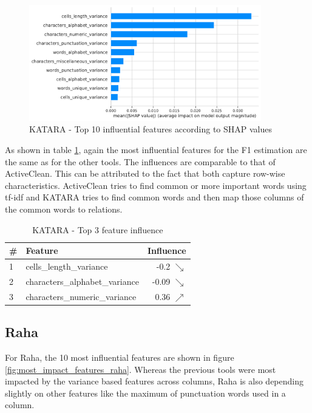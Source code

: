 \begin{figure}[H]
    \centering
    \includegraphics[width=0.9\textwidth]{thesis/Figures/RQ4/Shap_cell_f1_KATARA.pdf}
    \caption{KATARA - Top 10 influential features according to SHAP values}
    \label{fig:most_impact_features_katara}
\end{figure}

As shown in table \ref{tab:top_influence_features_KATARA}, again the most influential features for the F1 estimation are the same as for the other tools. The influences are comparable to that of ActiveClean. This can be attributed to the fact that both capture row-wise characteristics. ActiveClean tries to find common or more important words using tf-idf and KATARA tries to find common words and then map those columns of the common words to relations. 

\begin{table}[H]
\centering
\begin{tabular}{llr}
\toprule
 \# &                         Feature &         Influence \\
\midrule
 1 &         cells\_length\_variance &   -0.2 $\searrow$ \\
 2 &  characters\_alphabet\_variance &  -0.09 $\searrow$ \\
 3 &   characters\_numeric\_variance &   0.36 $\nearrow$ \\
\bottomrule
\end{tabular}
\caption{KATARA - Top 3 feature influence}
\label{tab:top_influence_features_KATARA}
\end{table}


\subsection{Raha}
For Raha, the 10 most influential features are shown in figure \ref{fig:most_impact_features_raha}. Whereas the previous tools were most impacted by the variance based features across columns, Raha is also depending slightly on other features like the maximum of punctuation words used in a column.

